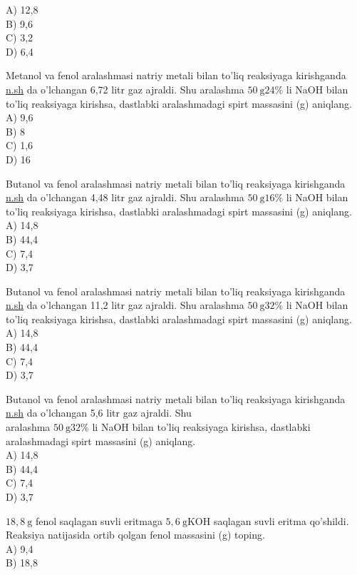A) 12,8\\
B) 9,6\\
C) 3,2\\
D) 6,4
  \item Metanol va fenol aralashmasi natriy metali bilan to'liq reaksiyaga kirishganda \href{http://n.sh}{n.sh} da o'lchangan 6,72 litr gaz ajraldi. Shu aralashma $50 \mathrm{~g} 24 \%$ li NaOH bilan to'liq reaksiyaga kirishsa, dastlabki aralashmadagi spirt massasini (g) aniqlang.\\
A) 9,6\\
B) 8\\
C) 1,6\\
D) 16
  \item Butanol va fenol aralashmasi natriy metali bilan to'liq reaksiyaga kirishganda \href{http://n.sh}{n.sh} da o'lchangan 4,48 litr gaz ajraldi. Shu aralashma $50 \mathrm{~g} 16 \%$ li NaOH bilan to'liq reaksiyaga kirishsa, dastlabki aralashmadagi spirt massasini (g) aniqlang.\\
A) 14,8\\
B) 44,4\\
C) 7,4\\
D) 3,7
  \item Butanol va fenol aralashmasi natriy metali bilan to'liq reaksiyaga kirishganda \href{http://n.sh}{n.sh} da o'lchangan 11,2 litr gaz ajraldi. Shu aralashma $50 \mathrm{~g} 32 \%$ li NaOH bilan to'liq reaksiyaga kirishsa, dastlabki aralashmadagi spirt massasini (g) aniqlang.\\
A) 14,8\\
B) 44,4\\
C) 7,4\\
D) 3,7
  \item Butanol va fenol aralashmasi natriy metali bilan to'liq reaksiyaga kirishganda \href{http://n.sh}{n.sh} da o'lchangan 5,6 litr gaz ajraldi. Shu\\
aralashma $50 \mathrm{~g} 32 \%$ li NaOH bilan to'liq reaksiyaga kirishsa, dastlabki aralashmadagi spirt massasini (g) aniqlang.\\
A) 14,8\\
B) 44,4\\
C) 7,4\\
D) 3,7
  \item $18,8 \mathrm{~g}$ fenol saqlagan suvli eritmaga $5,6 \mathrm{~g} \mathrm{KOH}$ saqlagan suvli eritma qo'shildi. Reaksiya natijasida ortib qolgan fenol massasini (g) toping.\\
A) 9,4\\
B) 18,8\\
